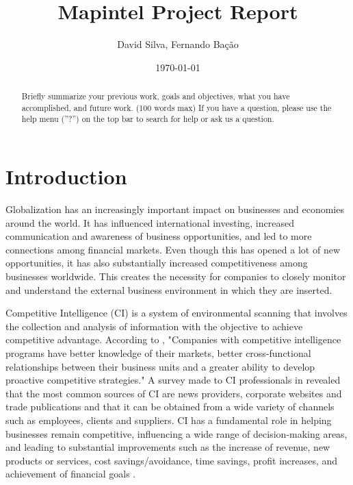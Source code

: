 \documentclass[a4paper]{article}
\title{Mapintel Project Report}
\author{David Silva, Fernando Bação}
\date{\today}
\begin{document}
\maketitle

\begin{abstract}
	Briefly summarize your previous work, goals and objectives, what you have accomplished, and future work. (100 words max) If you have a question, please use the help menu (''?'') on the top bar to search for help or ask us a question.
\end{abstract}

\section*{Introduction}
Globalization has an increasingly important impact on businesses and economies around the world. It has influenced international investing, increased communication and awareness of business opportunities, and led to more connections among financial markets. Even though this has opened a lot of new opportunities, it has also substantially increased competitiveness among businesses worldwide. This creates the necessity for companies to closely monitor and understand the external business environment in which they are inserted.

Competitive Intelligence (CI) is a system of environmental scanning that involves the collection and analysis of information with the objective to achieve competitive advantage. According to \citet{brod1999}, "Companies with competitive intelligence programs have better knowledge of their markets, better cross-functional relationships between their business units and a greater ability to develop proactive competitive strategies." A survey made to CI professionals in \citet{marin2004} revealed that the most common sources of CI are news providers, corporate websites and trade publications and that it can be obtained from a wide variety of channels such as employees, clients and suppliers. CI has a fundamental role in helping businesses remain competitive, influencing a wide range of decision-making areas, and leading to substantial improvements such as the increase of revenue, new products or services, cost savings/avoidance, time savings, profit increases, and achievement of financial goals \citep{calof2017}.
\end{document}
